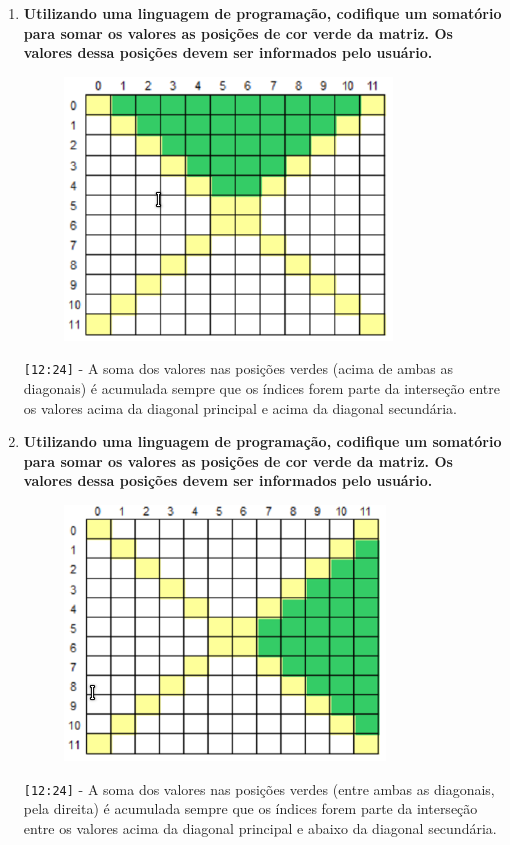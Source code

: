 \begin{enumerate}
	\pagebreak
	\item \textbf{Utilizando uma linguagem de programação, codifique um somatório para somar os valores as posições de cor verde da matriz. Os valores dessa posições devem ser informados pelo usuário.}
	\begin{figure}[H]
		\centering
		\includegraphics{7_3}
	\end{figure}
	
	\verb|[12:24]| - A soma dos valores nas posições verdes (acima de ambas as diagonais) é acumulada sempre que os índices forem parte da interseção entre os valores acima da diagonal principal e acima da diagonal secundária.
	
	\pagebreak
	\item \textbf{Utilizando uma linguagem de programação, codifique um somatório para somar os valores as posições de cor verde da matriz. Os valores dessa posições devem ser informados pelo usuário.}
	\begin{figure}[H]
		\centering
		\includegraphics{7_4}
	\end{figure}
	
	\verb|[12:24]| - A soma dos valores nas posições verdes (entre ambas as diagonais, pela direita) é acumulada sempre que os índices forem parte da interseção entre os valores acima da diagonal principal e abaixo da diagonal secundária.
	

\end{enumerate}
